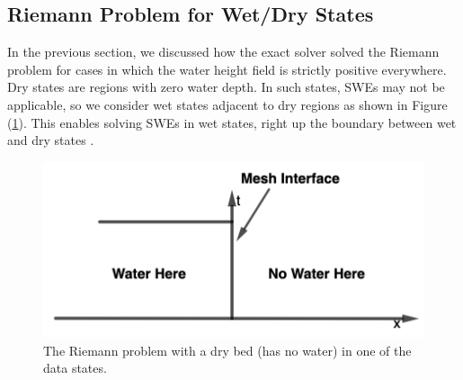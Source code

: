 \documentclass[9pt,a4paper]{article}
\newcommand{\Fig}[1]{Figure (\ref{fig:#1})}
\begin{document}
	
	\subsection{Riemann Problem for Wet/Dry States}
	
	In the previous section, we discussed how the exact solver solved the Riemann problem for cases in which the water height field is strictly positive everywhere. Dry states are regions with zero water depth. In such states, SWEs may not be applicable, so we consider wet states adjacent to dry regions as shown in  \Fig{dry-bed}. This enables solving SWEs in wet states, right up the boundary between wet and dry states  \citep{toro2001shock,ge:2008}.
	\begin{figure}[H]
		\centering
		\includegraphics[width=0.5\linewidth]{images/dd1}
		\caption{ The Riemann problem with a dry bed (has no water) in one of the data states. }
		\label{fig:dry-bed}
	\end{figure}
	
\end{document}
